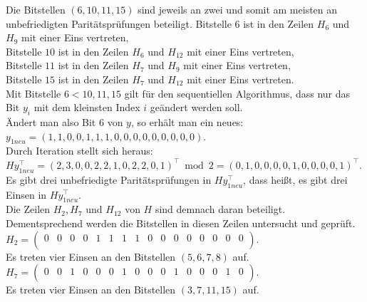 \begin{Beispiel}
    
    Die Bitstellen $(6, 10, 11, 15)$ sind jeweils an zwei und somit am meisten an unbefriedigten Paritätsprüfungen beteiligt.
    Bitstelle $6$ ist in den Zeilen $H_6$ und $H_9$ mit einer Eins vertreten,\\
    Bitstelle $10$ ist in den Zeilen $H_6$ und $H_{12}$ mit einer Eins vertreten,\\
    Bitstelle $11$ ist in den Zeilen $H_7$ und $H_9$ mit einer Eins vertreten,\\
    Bitstelle $15$ ist in den Zeilen $H_7$ und $H_{12}$ mit einer Eins vertreten.\\
    Mit Bitstelle $6 < 10, 11, 15$ gilt für den sequentiellen Algorithmus, dass nur das\\
    Bit $y_i$ mit dem kleinsten Index $i$ geändert werden soll.\\
    
    Ändert man also Bit $6$ von $y$, so erhält man ein neues:\\
    $y_{1neu} = (1,1,0,0,1,1,1,0,0,0,0,0,0,0,0,0).$\\
    
    Durch Iteration stellt sich heraus:\\
    $Hy_{1neu}^\intercal= (2,3,0,0,2,2,1,0,2,2,0,1)^\intercal \bmod 2= (0,1,0,0,0,0,1,0,0,0,0,1)^\intercal.$\\
    
    Es gibt drei unbefriedigte Paritätsprüfungen in $Hy_{1neu}^\intercal$, 
    dass hei\ss{}t, es gibt drei Einsen in $Hy_{1neu}^\intercal.$\\
    Die Zeilen $H_2, H_7$ und $H_{12}$ von $H$ sind demnach daran beteiligt.\\ 
    Dementsprechend werden die Bitstellen in diesen Zeilen untersucht und geprüft.\\
    
    $H_2= \left( \begin{array}{rrrrrrrrrrrrrrrr}
        0 & 0 & 0 & 0 & 1 & 1 & 1 & 1 & 0 & 0 & 0 & 0 & 0 & 0 & 0 & 0 \\
       \end{array}\right). 
    $\\
    Es treten vier Einsen an den Bitstellen $(5, 6, 7, 8)$ auf.\\
    
    
    $H_7= \left( \begin{array}{rrrrrrrrrrrrrrrr}
        0 & 0 & 1 & 0 & 0 & 0 & 1 & 0 & 0 & 0 & 1 & 0 & 0 & 0 & 1 & 0 \\
       \end{array}\right). 
    $\\
    Es treten vier Einsen an den Bitstellen $(3, 7, 11, 15)$ auf.\\
    

\end{Beispiel}
